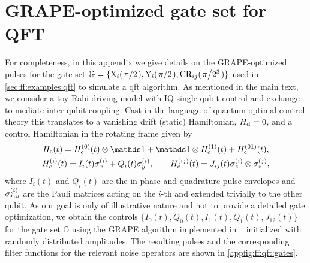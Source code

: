 \section{GRAPE-optimized gate set for QFT}\label{sec:app:ff:qft}
For completeness, in this appendix we give details on the GRAPE-optimized pulses for the gate set $\mathbb{G} = \lbrace\mr{X}_{i}(\flatfrac{\pi}{2}),\mr{Y}_{i}(\flatfrac{\pi}{2}),\mr{CR}_{ij}(\flatfrac{\pi}{2^3})\rbrace$ used in \cref{sec:ff:examples:qft} to simulate a \gls{qft} algorithm.
As mentioned in the main text, we consider a toy Rabi driving model with IQ single-qubit control and exchange to mediate inter-qubit coupling.
Cast in the language of quantum optimal control theory this translates to a vanishing drift (static) Hamiltonian, $H_{\mathrm{d}} =  0$, and a control Hamiltonian in the rotating frame given by
\begin{gather}
    \Hc(t) = \Hc\gth{0}(t)\otimes\eye + \eye\otimes\Hc\gth{1}(t) + \Hc\gth{01}(t), \\
    \Hc\gth{i}(t) = I_i(t)\sx\gth{i} + Q_i(t)\sy\gth{i},\qquad\Hc\gth{ij}(t) = J_{ij}(t)\sz\gth{i}\otimes\sz\gth{j},
\end{gather}
where $I_i(t)$ and $Q_i(t)$ are the in-phase and quadrature pulse envelopes and $\sigma_{x,y}^{(i)}$ are the Pauli matrices acting on the $i$-th and extended trivially to the other qubit.
As our goal is only of illustrative nature and not to provide a detailed gate optimization, we obtain the controls $\lbrace I_0(t), Q_0(t), I_1(t), Q_1(t), J_{12}(t)\rbrace$ for the gate set $\mathbb{G}$ using the GRAPE algorithm implemented in \qutip~\cite{Johansson2012} initialized with randomly distributed amplitudes.
The resulting pulses and the corresponding filter functions for the relevant noise operators are shown in \cref{appfig:ff:qft:gates}.


